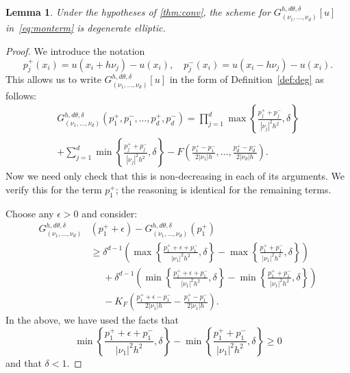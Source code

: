 \documentclass{amsart}
\theoremstyle{lemma}
\newtheorem{lemma}[theorem]{Lemma}
\theoremstyle{remark}
\begin{document}
\begin{lemma}\label{lem:degterms}
Under the hypotheses of \autoref{thm:conv}, the scheme for $G_{(\nu_1,\ldots,\nu_d)}^{h,d\theta,\delta}[u]$ in~\eqref{eq:monterm} is degenerate elliptic.
\end{lemma}
\begin{proof}
We introduce the notation
\[ p_j^+(x_i) = u(x_i+h\nu_j)-u(x_i),\quad p_j^-(x_i) = u(x_i-h\nu_j)-u(x_i). \]
This allows us to write $G_{(\nu_1,\ldots,\nu_d)}^{h,d\theta,\delta}[u]$ in the form of Definition~\ref{def:deg} as follows:
\begin{multline} G_{(\nu_1,\ldots,\nu_d)}^{h,d\theta,\delta}(p_1^+,p_1^-,\ldots,p_d^+,p_d^-) = 
   \prod\limits_{j=1}^d \max\left\{\frac{p_j^++p_j^-}{{\left\vert{\nu_j}\right\vert}^2h^2},\delta\right\} \\+
   \sum\limits_{j=1}^d\min\left\{\frac{p_j^++p_j^-}{{\left\vert{\nu_j}\right\vert}^2h^2},\delta\right\}- 
   F\left(\frac{p_1^+-p_1^-}{2{\left\vert{\nu_1}\right\vert}h},\ldots,\frac{p_d^+-p_d^-}{2{\left\vert{\nu_d}\right\vert}h}\right). \end{multline}
Now we need only check that this is non-decreasing in each of its arguments.  We verify this for the term $p_1^+$; the reasoning is identical for the remaining terms.

Choose any $\epsilon>0$ and consider:
\begin{align*}
G_{(\nu_1,\ldots,\nu_d)}^{h,d\theta,\delta}&(p_1^++\epsilon)-G_{(\nu_1,\ldots,\nu_d)}^{h,d\theta,\delta}(p_1^+) \\
  &\geq \delta^{d-1}\left(\max\left\{\frac{p_1^++\epsilon+p_1^-}{{\left\vert{\nu_1}\right\vert}^2h^2},\delta\right\}-\max\left\{\frac{p_1^++p_1^-}{{\left\vert{\nu_1}\right\vert}^2h^2},\delta\right\}\right)\\
  &\phantom{\geq} + \delta^{d-1}\left(\min\left\{\frac{p_1^++\epsilon+p_1^-}{{\left\vert{\nu_1}\right\vert}^2h^2},\delta\right\}-\min\left\{\frac{p_1^++p_1^-}{{\left\vert{\nu_1}\right\vert}^2h^2},\delta\right\}\right)\\
  &\phantom{\geq}-K_F\left(\frac{p_1^++\epsilon-p_1^-}{2{\left\vert{\nu_1}\right\vert}h}-\frac{p_1^+-p_1^-}{2{\left\vert{\nu_1}\right\vert}h}\right).
\end{align*}
In the above, we have used the facts that
\[ \min\left\{\frac{p_1^++\epsilon+p_1^-}{{\left\vert{\nu_1}\right\vert}^2h^2},\delta\right\}-\min\left\{\frac{p_1^++p_1^-}{{\left\vert{\nu_1}\right\vert}^2h^2},\delta\right\} \geq 0  \]
and that $\delta<1$.


\end{proof}
\end{document}
